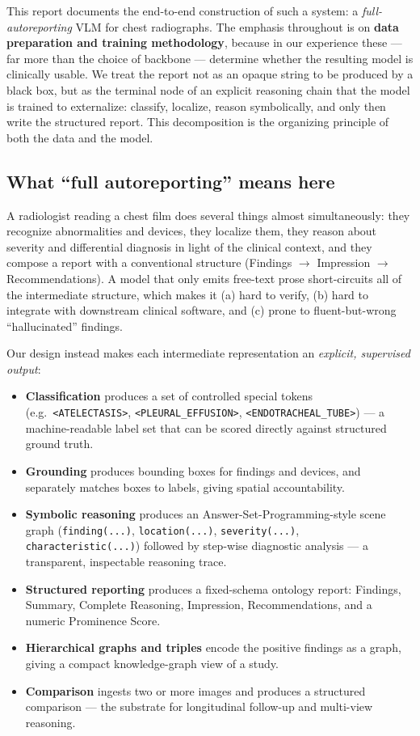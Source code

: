 \documentclass[11pt,a4paper]{article}
\begin{document}
This report documents the end-to-end construction of such a system: a \emph{full-autoreporting} VLM for chest radiographs. The emphasis throughout is on \textbf{data preparation and training methodology}, because in our experience these --- far more than the choice of backbone --- determine whether the resulting model is clinically usable. We treat the report not as an opaque string to be produced by a black box, but as the terminal node of an explicit reasoning chain that the model is trained to externalize: classify, localize, reason symbolically, and only then write the structured report. This decomposition is the organizing principle of both the data and the model.

\subsection{What ``full autoreporting'' means here}
A radiologist reading a chest film does several things almost simultaneously: they recognize abnormalities and devices, they localize them, they reason about severity and differential diagnosis in light of the clinical context, and they compose a report with a conventional structure (Findings $\rightarrow$ Impression $\rightarrow$ Recommendations). A model that only emits free-text prose short-circuits all of the intermediate structure, which makes it (a) hard to verify, (b) hard to integrate with downstream clinical software, and (c) prone to fluent-but-wrong ``hallucinated'' findings.

Our design instead makes each intermediate representation an \emph{explicit, supervised output}:
\begin{itemize}[leftmargin=1.4em]
  \item \textbf{Classification} produces a set of controlled special tokens (e.g.\ \texttt{<ATELECTASIS>}, \texttt{<PLEURAL\_EFFUSION>}, \texttt{<ENDOTRACHEAL\_TUBE>}) --- a machine-readable label set that can be scored directly against structured ground truth.
  \item \textbf{Grounding} produces bounding boxes for findings and devices, and separately matches boxes to labels, giving spatial accountability.
  \item \textbf{Symbolic reasoning} produces an Answer-Set-Programming-style scene graph (\texttt{finding(...)}, \texttt{location(...)}, \texttt{severity(...)}, \texttt{characteristic(...)}) followed by step-wise diagnostic analysis --- a transparent, inspectable reasoning trace.
  \item \textbf{Structured reporting} produces a fixed-schema ontology report: Findings, Summary, Complete Reasoning, Impression, Recommendations, and a numeric Prominence Score.
  \item \textbf{Hierarchical graphs and triples} encode the positive findings as a graph, giving a compact knowledge-graph view of a study.
  \item \textbf{Comparison} ingests two or more images and produces a structured comparison --- the substrate for longitudinal follow-up and multi-view reasoning.
\end{itemize}
\end{document}
